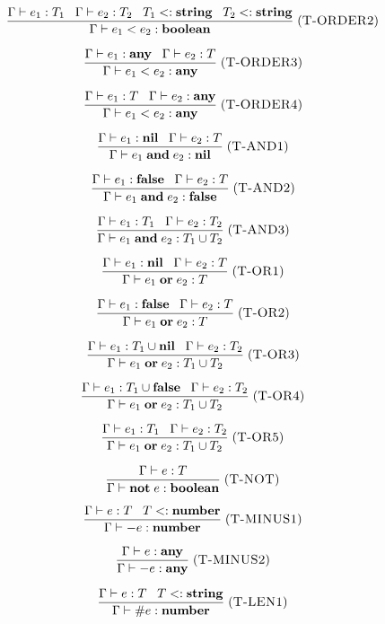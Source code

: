 \documentclass[12pt]{article}
\newcommand{\Any}{\mathbf{any}}
\newcommand{\Nil}{\mathbf{nil}}
\newcommand{\False}{\mathbf{false}}
\newcommand{\Boolean}{\mathbf{boolean}}
\newcommand{\Number}{\mathbf{number}}
\newcommand{\String}{\mathbf{string}}
\newcommand{\kw}[1]{\mathbf{#1}}
\newcommand{\mylabel}[1]{\; (\textsc{#1})}
\newcommand{\subtype}{<:}
\newcommand{\env}{\Gamma}
\begin{document}
\[
\frac{\env \vdash e_{1}:T_{1} \;\;\;
      \env \vdash e_{2}:T_{2} \;\;\;
      T_{1} \subtype \String \;\;\;
      T_{2} \subtype \String}
     {\env \vdash e_{1} < e_{2} : \Boolean}
\mylabel{T-ORDER2}
\]

\[
\frac{\env \vdash e_{1}:\Any \;\;\;
      \env \vdash e_{2}:T}
     {\env \vdash e_{1} < e_{2} : \Any}
\mylabel{T-ORDER3}
\]

\[
\frac{\env \vdash e_{1}:T \;\;\;
      \env \vdash e_{2}:\Any}
     {\env \vdash e_{1} < e_{2} : \Any}
\mylabel{T-ORDER4}
\]

\[
\frac{\env \vdash e_{1}:\Nil \;\;\;
      \env \vdash e_{2}:T}
     {\env \vdash e_{1} \; \kw{and} \; e_{2} : \Nil}
\mylabel{T-AND1}
\]

\[
\frac{\env \vdash e_{1}:\False \;\;\;
      \env \vdash e_{2}:T}
     {\env \vdash e_{1} \; \kw{and} \; e_{2} : \False}
\mylabel{T-AND2}
\]

\[
\frac{\env \vdash e_{1}:T_{1} \;\;\;
      \env \vdash e_{2}:T_{2}}
     {\env \vdash e_{1} \; \kw{and} \; e_{2} : T_{1} \cup T_{2}}
\mylabel{T-AND3}
\]

\[
\frac{\env \vdash e_{1}:\Nil \;\;\;
      \env \vdash e_{2}:T}
     {\env \vdash e_{1} \; \kw{or} \; e_{2} : T}
\mylabel{T-OR1}
\]

\[
\frac{\env \vdash e_{1}:\False \;\;\;
      \env \vdash e_{2}:T}
     {\env \vdash e_{1} \; \kw{or} \; e_{2} : T}
\mylabel{T-OR2}
\]

\[
\frac{\env \vdash e_{1}:T_{1} \cup \Nil \;\;\;
      \env \vdash e_{2}:T_{2}}
     {\env \vdash e_{1} \; \kw{or} \; e_{2} : T_{1} \cup T_{2}}
\mylabel{T-OR3}
\]

\[
\frac{\env \vdash e_{1}:T_{1} \cup \False \;\;\;
      \env \vdash e_{2}:T_{2}}
     {\env \vdash e_{1} \; \kw{or} \; e_{2} : T_{1} \cup T_{2}}
\mylabel{T-OR4}
\]

\[
\frac{\env \vdash e_{1}:T_{1} \;\;\;
      \env \vdash e_{2}:T_{2}}
     {\env \vdash e_{1} \; \kw{or} \; e_{2} : T_{1} \cup T_{2}}
\mylabel{T-OR5}
\]

\[
\frac{\env \vdash e:T}
     {\env \vdash \kw{not} \; e : \Boolean}
\mylabel{T-NOT}
\]

\[
\frac{\env \vdash e:T \;\;\;
      T \subtype \Number}
     {\env \vdash - e : \Number}
\mylabel{T-MINUS1}
\]

\[
\frac{\env \vdash e:\Any}
     {\env \vdash - e : \Any}
\mylabel{T-MINUS2}
\]

\[
\frac{\env \vdash e:T \;\;\;
      T \subtype \String}
     {\env \vdash \# e : \Number}
\mylabel{T-LEN1}
\]
\end{document}
